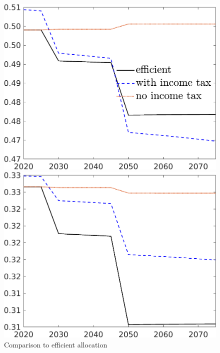\begin{figure}[h!!]
	\centering
	\caption{Comparison to efficient allocation }\label{fig:Compno_eff_BN0}
	\begin{minipage}[]{0.32\textwidth}
		\includegraphics[width=1\textwidth]{../../codding_model/own_basedOnFried/optimalPol_elastS_DisuSci/figures/all_1705/hh_CompEffOPT_T_NoTaus_spillover0_sep1_BN0_ineq0_etaa0.79_lgd1.png}
	\end{minipage}
	\begin{minipage}[]{0.32\textwidth}
		\includegraphics[width=1\textwidth]{../../codding_model/own_basedOnFried/optimalPol_elastS_DisuSci/figures/all_1705/hl_CompEffOPT_T_NoTaus_spillover0_sep1_BN0_ineq0_etaa0.79_lgd0.png}

\end{minipage}
\end{figure}
